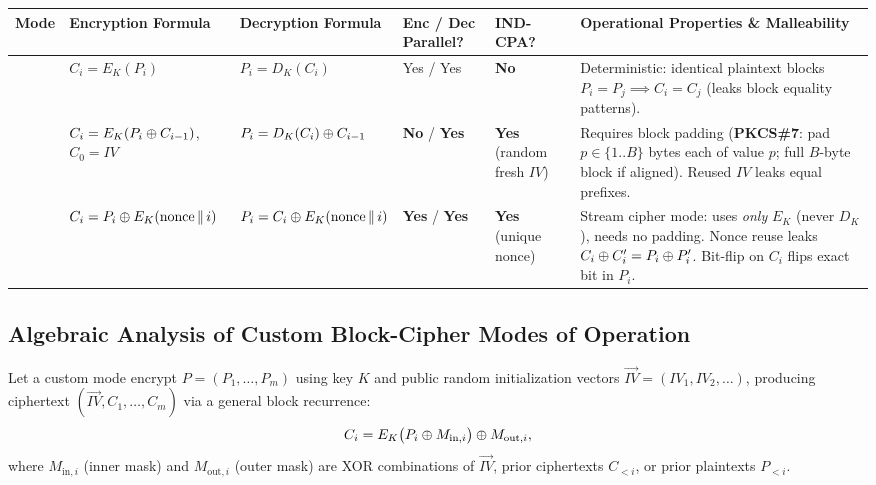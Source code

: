 \begin{table}[h!]
\centering
\footnotesize
\begin{tabularx}{\textwidth}{@{}L{1.1cm} L{3.4cm} L{3.2cm} L{1.8cm} L{1.8cm} Y@{}}
\toprule
\textbf{Mode} & \textbf{Encryption Formula} & \textbf{Decryption Formula} & \textbf{Enc / Dec Parallel?} & \textbf{IND-CPA?} & \textbf{Operational Properties \& Malleability} \\
\midrule
{} & $C_i = E_K(P_i)$ & $P_i = D_K(C_i)$ & Yes / Yes & \textbf{No} & Deterministic: identical plaintext blocks $P_i = P_j \implies C_i = C_j$ (leaks block equality patterns). \\
 & $C_i = E_K(P_i \oplus C_{i-1})$, $C_0 = IV$ & $P_i = D_K(C_i) \oplus C_{i-1}$ & \textbf{No} / \textbf{Yes} & \textbf{Yes} (random fresh $IV$) & Requires block padding (\textbf{PKCS\#7}: pad $p \in \{1..B\}$ bytes each of value $p$; full $B$-byte block if aligned). Reused $IV$ leaks equal prefixes. \\
 & $C_i = P_i \oplus E_K(\text{nonce} \,\|\, i)$ & $P_i = C_i \oplus E_K(\text{nonce} \,\|\, i)$ & \textbf{Yes} / \textbf{Yes} & \textbf{Yes} (unique nonce) & Stream cipher mode: uses \emph{only} $E_K$ (never $D_K$), needs no padding. Nonce reuse leaks $C_i \oplus C_i' = P_i \oplus P_i'$. Bit-flip on $C_i$ flips exact bit in $P_i$. \\
\bottomrule
\end{tabularx}
\end{table}

\subsection{Algebraic Analysis of Custom Block-Cipher Modes of Operation}
Let a custom mode encrypt $P = (P_1, \dots, P_m)$ using key $K$ and public random initialization vectors $\overrightarrow{IV} = (IV_1, IV_2, \dots)$, producing ciphertext $(\overrightarrow{IV}, C_1, \dots, C_m)$ via a general block recurrence:
\[
  C_i = E_K\big(P_i \oplus M_{\text{in}, i}\big) \oplus M_{\text{out}, i},
\]
where $M_{\text{in}, i}$ (inner mask) and $M_{\text{out}, i}$ (outer mask) are XOR combinations of $\overrightarrow{IV}$, prior ciphertexts $C_{<i}$, or prior plaintexts $P_{<i}$.

